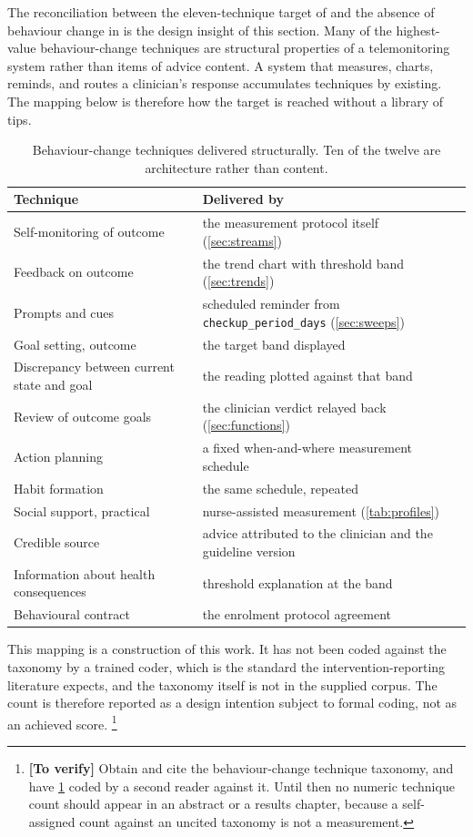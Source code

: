\documentclass[12pt,a4paper,oneside]{report}
\newcommand{\verify}[1]{\footnote{\textbf{[To verify]} #1}}
\begin{document}
The reconciliation between the eleven-technique target of \textcite{zhou2024} and the absence of behaviour change in \textcite{mihevc2025} is the design insight of this section. Many of the highest-value behaviour-change techniques are structural properties of a telemonitoring system rather than items of advice content. A system that measures, charts, reminds, and routes a clinician's response accumulates techniques by existing. The mapping below is therefore how the target is reached without a library of tips.

\begin{table}[htbp]
\centering\small
\caption{Behaviour-change techniques delivered structurally. Ten of the twelve are architecture rather than content.}\label{tab:bct-mapping}
\begin{tabularx}{\textwidth}{@{}>{\raggedright\arraybackslash}p{6.0cm} X@{}}
\toprule
\textbf{Technique} & \textbf{Delivered by} \\
\midrule
Self-monitoring of outcome & the measurement protocol itself (\cref{sec:streams}) \\
Feedback on outcome & the trend chart with threshold band (\cref{sec:trends}) \\
Prompts and cues & scheduled reminder from \texttt{checkup\_period\_days} (\cref{sec:sweeps}) \\
Goal setting, outcome & the target band displayed \\
Discrepancy between current state and goal & the reading plotted against that band \\
Review of outcome goals & the clinician verdict relayed back (\cref{sec:functions}) \\
Action planning & a fixed when-and-where measurement schedule \\
Habit formation & the same schedule, repeated \\
Social support, practical & nurse-assisted measurement (\cref{tab:profiles}) \\
Credible source & advice attributed to the clinician and the guideline version \\
Information about health consequences & threshold explanation at the band \\
Behavioural contract & the enrolment protocol agreement \\
\bottomrule
\end{tabularx}
\end{table}

This mapping is a construction of this work. It has not been coded against the taxonomy by a trained coder, which is the standard the intervention-reporting literature expects, and the taxonomy itself is not in the supplied corpus. The count is therefore reported as a design intention subject to formal coding, not as an achieved score.%
\verify{Obtain and cite the behaviour-change technique taxonomy, and have \cref{tab:bct-mapping} coded by a second reader against it. Until then no numeric technique count should appear in an abstract or a results chapter, because a self-assigned count against an uncited taxonomy is not a measurement.}
\end{document}
